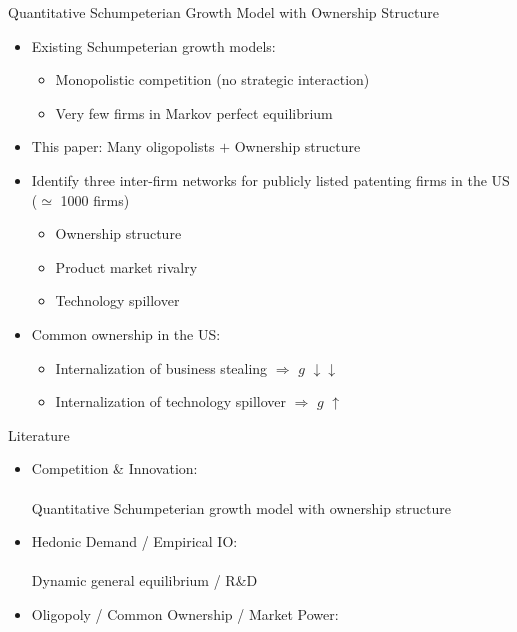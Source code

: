 \documentclass[
  10pt,               %
  aspectratio=169,    %
  handout             %
]{beamer}
\theoremstyle{plain}
\begin{document}
\begin{frame}{Quantitative Schumpeterian Growth Model with Ownership Structure}
  \begin{itemize}
    \item Existing Schumpeterian growth models:
    \begin{itemize}
      \item Monopolistic competition (no strategic interaction)
      \item Very few firms in Markov perfect equilibrium
    \end{itemize}
    \medskip{}
    \item This paper: Many oligopolists $+$ Ownership structure
    \medskip{}\pause
    \item Identify three inter-firm networks for publicly listed patenting firms in the US ($\simeq$ 1000 firms)
    \begin{itemize}
      \item Ownership structure
      \item Product market rivalry
      \item Technology spillover
    \end{itemize}
    \medskip{}\pause
    \item Common ownership in the US:
    \begin{itemize}
      \item Internalization of business stealing $\Longrightarrow$ $g$ $\downarrow \downarrow$
      \item Internalization of technology spillover $\Longrightarrow$ $g$ $\uparrow$
    \end{itemize}
  \end{itemize}
\end{frame}

\begin{frame}{Literature}
  \begin{itemize}
    \item Competition \& Innovation: \\
          {\footnotesize\citet{d-Aspremont1988-je,Kamien1992-la,Aghion2001-yc,Aghion2005-vw,Acemoglu2012-bj,Aghion2013-nq,Bloom2013-pn,Lopez2019-sl,Peters2020-sd,Akcigit2021-ns,Akcigit2023-zl,Liu2022-iw,Cavenaile2023-lo,Anton2023-ej,Anton2024-pw,Kini2024-kd,Hopenhayn2024-ya}}\\
          \alert{Quantitative Schumpeterian growth model with ownership structure}\\
  \item Hedonic Demand / Empirical IO: \\
          {\footnotesize\citet{Lancaster1966-sg,Rosen1974-ep,Berry1995-lx,Nevo2001-ja,Pellegrino2024-dn,Ederer2024-rw}}\\
          \alert{Dynamic general equilibrium / R\&D}
    \item Oligopoly / Common Ownership / Market Power: \\
          {\footnotesize\citet{Rubinstein1983-pi,Rotemberg1984-jz,Neary2003-sn,Atkeson2008-zc,Gutierrez2017-wl,He2017-ix,Azar2018-cc,Azar2022-cn,Autor2020-mr,Baqaee2020-eb,De_Loecker2020-jn,Azar2021-uh,Edmond2023-bg}}
  \end{itemize}
\end{frame}
\end{document}
